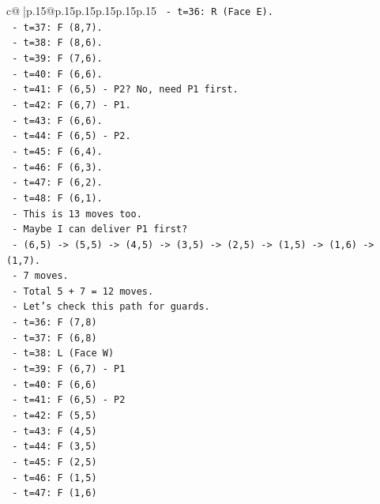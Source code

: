 \documentclass{article}
\begin{document}
{\begin{supertabular}{c@{$\;$}|p{.15\linewidth}@{}p{.15\linewidth}p{.15\linewidth}p{.15\linewidth}p{.15\linewidth}p{.15\linewidth}}
{{{\texttt{        {-} t=36: R (Face E).} \\
\texttt{        {-} t=37: F (8,7).} \\
\texttt{        {-} t=38: F (8,6).} \\
\texttt{        {-} t=39: F (7,6).} \\
\texttt{        {-} t=40: F (6,6).} \\
\texttt{        {-} t=41: F (6,5) {-} P2? No, need P1 first.} \\
\texttt{        {-} t=42: F (6,7) {-} P1.} \\
\texttt{        {-} t=43: F (6,6).} \\
\texttt{        {-} t=44: F (6,5) {-} P2.} \\
\texttt{        {-} t=45: F (6,4).} \\
\texttt{        {-} t=46: F (6,3).} \\
\texttt{        {-} t=47: F (6,2).} \\
\texttt{        {-} t=48: F (6,1).} \\
\texttt{        {-} This is 13 moves too.} \\
\texttt{      {-} Maybe I can deliver P1 first?} \\
\texttt{        {-} (6,5) {-}> (5,5) {-}> (4,5) {-}> (3,5) {-}> (2,5) {-}> (1,5) {-}> (1,6) {-}> (1,7).} \\
\texttt{        {-} 7 moves.} \\
\texttt{        {-} Total 5 + 7 = 12 moves.} \\
\texttt{        {-} Let's check this path for guards.} \\
\texttt{        {-} t=36: F (7,8)} \\
\texttt{        {-} t=37: F (6,8)} \\
\texttt{        {-} t=38: L (Face W)} \\
\texttt{        {-} t=39: F (6,7) {-} P1} \\
\texttt{        {-} t=40: F (6,6)} \\
\texttt{        {-} t=41: F (6,5) {-} P2} \\
\texttt{        {-} t=42: F (5,5)} \\
\texttt{        {-} t=43: F (4,5)} \\
\texttt{        {-} t=44: F (3,5)} \\
\texttt{        {-} t=45: F (2,5)} \\
\texttt{        {-} t=46: F (1,5)} \\
\texttt{        {-} t=47: F (1,6)} \\
}}}
\end{supertabular}}
\end{document}
